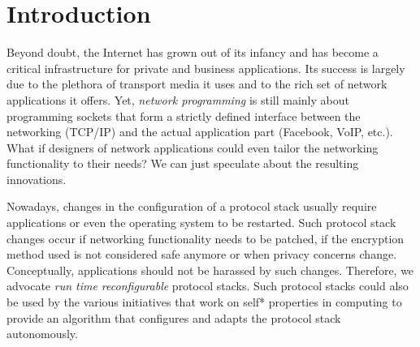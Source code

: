 \documentclass{sig-alternate}
\begin{document}



\vspace{-0.2cm}
\section{Introduction}
Beyond doubt, the Internet has grown out of its infancy and has become a
critical infrastructure for private and business applications. Its success is
largely due to the plethora of transport media 
it uses and to the rich set of network applications 
it offers. Yet, \emph{network programming} is still
mainly about programming sockets that form a strictly defined interface between
the networking (TCP/IP) and the actual application part (Facebook, VoIP, etc.).
What if designers of network applications could even tailor the networking
functionality to their needs? We can just speculate about the resulting
innovations. 

Nowadays, changes in the configuration of a protocol stack usually require applications or even the operating system to be restarted. 
Such protocol stack changes occur if networking functionality needs to be patched, if the encryption method used is not considered safe anymore or when privacy concerns change. Conceptually, applications should not be harassed by such changes. Therefore, we advocate \textit{run time reconfigurable} protocol stacks. Such protocol stacks could also be used by the various initiatives that work on self* properties in computing to provide an algorithm that configures and adapts the protocol stack autonomously.



\end{document}
